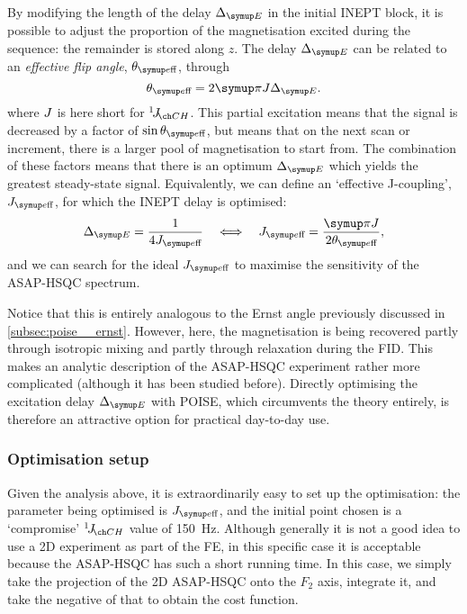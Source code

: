 By modifying the length of the delay $\DeltaE$ in the initial INEPT block, it is possible to adjust the proportion of the  magnetisation excited during the sequence: the remainder is stored along $z$.
The delay $\DeltaE$ can be related to an \textit{effective flip angle}, $\thetaeff$, through
\begin{equation}
    \label{eq:asaphsqc_ernst_angle}
    \thetaeff = 2\cpi J\DeltaE.
\end{equation}
where $J\/$ is here short for $\oneJ{CH}$.
This partial excitation means that the signal is decreased by a factor of $\sin\thetaeff$, but means that on the next scan or increment, there is a larger pool of  magnetisation to start from.
The combination of these factors means that there is an optimum $\DeltaE$ which yields the greatest steady-state signal.
Equivalently, we can define an `effective J-coupling', $\Jeff$, for which the INEPT delay is optimised:
\begin{equation}
    \label{eq:asaphsqc_j_eff}
    \DeltaE = \frac{1}{4\Jeff} \quad\Longleftrightarrow\quad \Jeff = \frac{\cpi J}{2\thetaeff},
\end{equation}
and we can search for the ideal $\Jeff$ to maximise the sensitivity of the ASAP-HSQC spectrum.

Notice that this is entirely analogous to the Ernst angle previously discussed in \cref{subsec:poise__ernst}.
However, here, the magnetisation is being recovered partly through isotropic mixing and partly through relaxation during the FID.
This makes an analytic description of the ASAP-HSQC experiment rather more complicated (although it has been studied before\autocite{Koos2019JMR}).
Directly optimising the excitation delay $\DeltaE$ with POISE, which circumvents the theory entirely, is therefore an attractive option for practical day-to-day use.


\subsubsection{Optimisation setup}

Given the analysis above, it is extraordinarily easy to set up the optimisation: the parameter being optimised is $\Jeff$, and the initial point chosen is a `compromise' $\oneJ{CH}$ value of \qty{150}{\Hz}.
Although generally it is not a good idea to use a 2D experiment as part of the FE, in this specific case it is acceptable because the ASAP-HSQC has such a short running time.
In this case, we simply take the projection of the 2D ASAP-HSQC onto the $F_2$ axis, integrate it, and take the negative of that to obtain the cost function.

